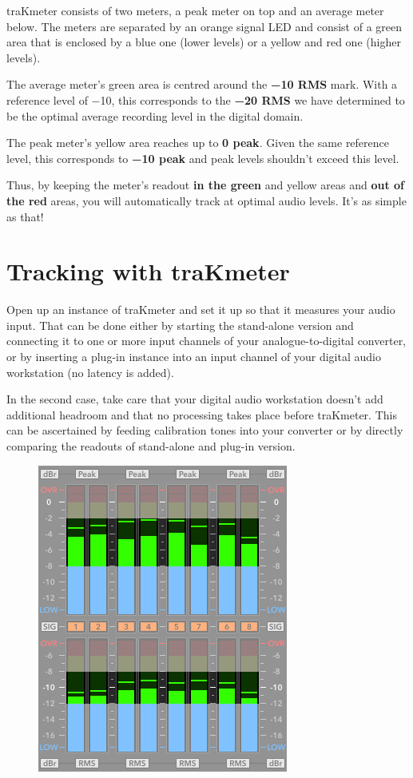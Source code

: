 traKmeter consists of two meters, a peak meter on top and an average
meter below.  The meters are separated by an orange signal LED and
consist of a green area that is enclosed by a blue one (lower levels)
or a yellow and red one (higher levels).

The average meter's green area is centred around the
\textbf{\SI{-10}{\dBr} RMS} mark.  With a reference level of
\SI{-10}{\dBFS}, this corresponds to the \textbf{\SI{-20}{\dBFS} RMS}
we have determined to be the optimal average recording level in the
digital domain.

The peak meter's yellow area reaches up to \textbf{\SI{0}{\dBr} peak}.
Given the same reference level, this corresponds to
\textbf{\SI{-10}{\dBFS} peak} and peak levels shouldn't exceed this
level.

Thus, by keeping the meter's readout \textbf{in the green} and yellow
areas and \textbf{out of the red} areas, you will automatically track
at optimal audio levels.  It's as simple as that!

\section{Tracking with traKmeter}
\label{sec:tracking_with_trakmeter}

Open up an instance of traKmeter and set it up so that it measures
your audio input.  That can be done either by starting the stand-alone
version and connecting it to one or more input channels of your
analogue-to-digital converter, or by inserting a plug-in instance into
an input channel of your digital audio workstation (no latency is
added).

In the second case, take care that your digital audio workstation
doesn't add additional headroom and that no processing takes place
before traKmeter.  This can be ascertained by feeding calibration
tones into your converter or by directly comparing the readouts of
stand-alone and plug-in version.

\begin{figure}
  \includegraphics[scale=0.425,clip]{include/images/trakmeter_optimal.png}
\end{figure}

